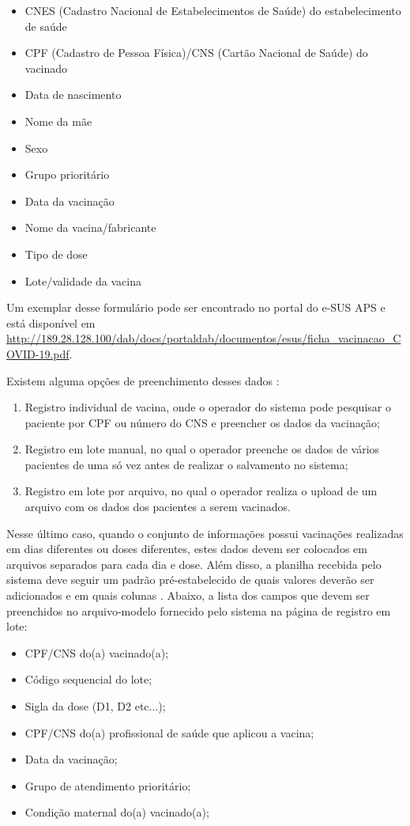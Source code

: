 \begin{itemize}
  \item CNES (Cadastro Nacional de Estabelecimentos de Saúde) do estabelecimento de saúde
  \item CPF (Cadastro de Pessoa Física)/CNS (Cartão Nacional de Saúde) do vacinado
  \item Data de nascimento
  \item Nome da mãe
  \item Sexo
  \item Grupo prioritário
  \item Data da vacinação
  \item Nome da vacina/fabricante
  \item Tipo de dose
  \item Lote/validade da vacina
\end{itemize}

Um exemplar desse formulário pode ser encontrado no portal do e-SUS APS e está disponível em \url{http://189.28.128.100/dab/docs/portaldab/documentos/esus/ficha_vacinacao_COVID-19.pdf}.

Existem alguma opções de preenchimento desses dados \cite{roteiro2021sipni}:
\begin{enumerate}[label=\textbf{\roman*}]
  \item Registro individual de vacina, onde o operador do sistema pode pesquisar o paciente por CPF ou número do CNS e preencher os dados da vacinação;
  \item Registro em lote manual, no qual o operador preenche os dados de vários pacientes de uma só vez antes de realizar o salvamento no sistema;
  \item Registro em lote por arquivo, no qual o operador realiza o upload de um arquivo com os dados dos pacientes a serem vacinados.
\end{enumerate}

Nesse último caso, quando o conjunto de informações possui vacinações realizadas em dias diferentes ou doses diferentes, estes dados devem ser colocados em arquivos separados para cada dia e dose. Além disso, a planilha recebida pelo sistema deve seguir um padrão pré-estabelecido de quais valores deverão ser adicionados e em quais colunas \cite{roteiro2021sipni}. Abaixo, a lista dos campos que devem ser preenchidos no arquivo-modelo fornecido pelo sistema na página de registro em lote:

\begin{itemize}
  \item CPF/CNS do(a) vacinado(a);
  \item Código sequencial do lote;
  \item Sigla da dose (D1, D2 etc...);
  \item CPF/CNS do(a) profissional de saúde que aplicou a vacina;
  \item Data da vacinação;
  \item Grupo de atendimento prioritário;
  \item Condição maternal do(a) vacinado(a);
\end{itemize}


